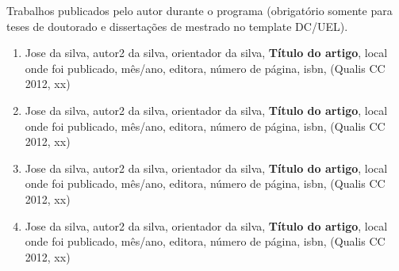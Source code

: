 \documentclass[
	12pt,				%
	openright,			%
	twoside,			%
	a4paper,			%
	tcc,			%
	]{ABNT-CCT-UENP}
\begin{document}
\noindent
Trabalhos publicados pelo autor durante o programa (obrigatório somente
para teses de doutorado e dissertações de mestrado no template DC/UEL).

\vspace{12pt}

\begin{enumerate}

\item Jose da silva, autor2 da silva, orientador da silva, \textbf{Título do artigo}, local onde foi
publicado, mês/ano, editora, número de página, isbn, (Qualis CC 2012, xx)

\item Jose da silva, autor2 da silva, orientador da silva, \textbf{Título do artigo}, local onde foi
publicado, mês/ano, editora, número de página, isbn, (Qualis CC 2012, xx)

\item Jose da silva, autor2 da silva, orientador da silva, \textbf{Título do artigo}, local onde foi
publicado, mês/ano, editora, número de página, isbn, (Qualis CC 2012, xx)

\item Jose da silva, autor2 da silva, orientador da silva, \textbf{Título do artigo}, local onde foi
publicado, mês/ano, editora, número de página, isbn, (Qualis CC 2012, xx)

\end{enumerate}



\printindex
\end{document}
